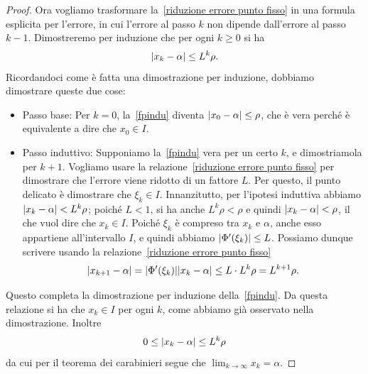\documentclass[a4paper]{report}
\DeclarePairedDelimiter{\abs}{\lvert}{\rvert}
\theoremstyle{definition}
\theoremstyle{remark}
\begin{document}
\begin{proof}
Ora vogliamo trasformare la~\eqref{riduzione errore punto fisso} in una formula esplicita per l'errore, in cui l'errore al passo $k$ non dipende dall'errore al passo $k-1$. Dimostreremo per induzione che per ogni $k\geq 0$ si ha
\begin{equation} \label{fpindu}
    \abs{x_k - \alpha} \leq L^k \rho.
\end{equation}
Ricordandoci come è fatta una dimostrazione per induzione, dobbiamo dimostrare queste due cose:
\begin{itemize}
    \item Passo base: Per $k=0$, la~\eqref{fpindu} diventa $\abs{x_0 - \alpha} \leq \rho$, che è vera perché è equivalente a dire che $x_0 \in I$. 
    \item Passo induttivo: Supponiamo la~\eqref{fpindu} vera per un certo $k$, e dimostriamola per $k+1$. Vogliamo usare la relazione~\eqref{riduzione errore punto fisso} per dimostrare che l'errore viene ridotto di un fattore $L$. Per questo, il punto delicato è dimostrare che $\xi_k \in I$. Innanzitutto, per l'ipotesi induttiva abbiamo $\abs{x_k - \alpha} < L^k \rho$; poiché $L<1$, si ha anche $L^k\rho < \rho$ e quindi $\abs{x_k - \alpha}<\rho$, il che vuol dire che $x_k\in I$. Poiché $\xi_k$ è compreso tra $x_k$ e $\alpha$, anche esso appartiene all'intervallo $I$, e quindi abbiamo $\abs{\Phi'(\xi_k)} \leq L$. Possiamo dunque scrivere usando la relazione~\eqref{riduzione errore punto fisso}
    \begin{equation} \label{fpindu2}
        \abs{x_{k+1} - \alpha} = \abs{\Phi'(\xi_k)} \abs{x_k - \alpha} \leq L \cdot L^k \rho = L^{k+1}\rho.
    \end{equation}  
\end{itemize}
Questo completa la dimostrazione per induzione della~\eqref{fpindu}. Da questa relazione si ha che $x_k \in I$ per ogni $k$, come abbiamo già osservato nella dimostrazione. Inoltre
\[
0 \leq \abs{x_k - \alpha} \leq L^k \rho
\]
da cui per il teorema dei carabinieri segue che $\lim_{k\to \infty} x_k = \alpha$.
\end{proof}
\end{document}
